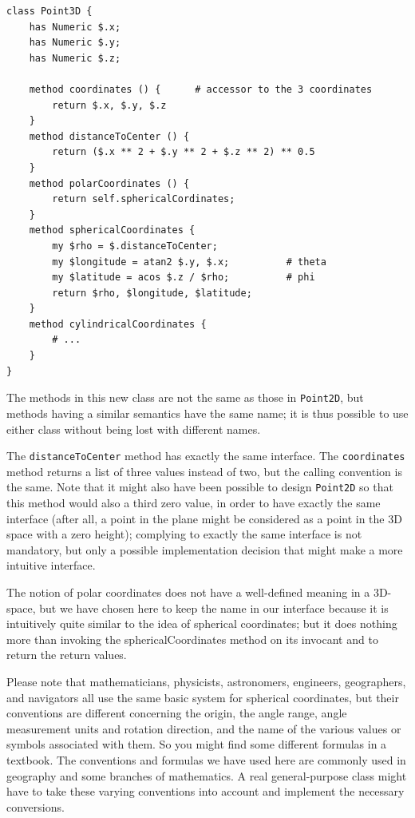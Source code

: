 \begin{verbatim}
class Point3D {
    has Numeric $.x;
    has Numeric $.y;
    has Numeric $.z;
    
    method coordinates () {      # accessor to the 3 coordinates
        return $.x, $.y, $.z
    }
    method distanceToCenter () {
        return ($.x ** 2 + $.y ** 2 + $.z ** 2) ** 0.5
    }
    method polarCoordinates () {
    	return self.sphericalCordinates;
    }
    method sphericalCoordinates {
    	my $rho = $.distanceToCenter;
    	my $longitude = atan2 $.y, $.x;          # theta
    	my $latitude = acos $.z / $rho;          # phi 
    	return $rho, $longitude, $latitude;
    }
    method cylindricalCoordinates {
    	# ...
    }
}
\end{verbatim}

The methods in this new class are not the same as those in 
{\tt Point2D}, but methods having a similar semantics have 
the same name; it is thus possible to use either class 
without being lost with different names. 

The {\tt distanceToCenter} method has exactly the same interface. 
The {\tt coordinates} method returns a list of three values 
instead of two, but the calling convention is the same. Note 
that it might also have been possible to design {\tt Point2D} 
so that this method would also a third zero value, in order 
to have exactly the same interface (after all, a point in 
the plane might be considered as a point in the 3D space 
with a zero height); complying to exactly the same 
interface is not mandatory, but only a possible implementation 
decision that might make a more intuitive interface. 

The notion of polar coordinates does not have a well-defined 
meaning in a 3D-space, but we have chosen here to keep the name 
in our interface because it is intuitively quite similar to 
the idea of spherical coordinates; but it does nothing more 
than invoking the sphericalCoordinates method on its invocant 
and to return the return values.

Please note that mathematicians, physicists, astronomers, 
engineers, geographers, and navigators all use the same basic system 
for spherical coordinates, but their conventions are different 
concerning the origin, the angle range, angle measurement 
units and rotation direction, and the name of the various 
values or symbols associated with them. So you might find 
some different formulas in a textbook. The conventions and 
formulas we have used here are commonly used in geography and 
some branches of mathematics. A real general-purpose class 
might have to take these varying conventions into account and 
implement the necessary conversions.

